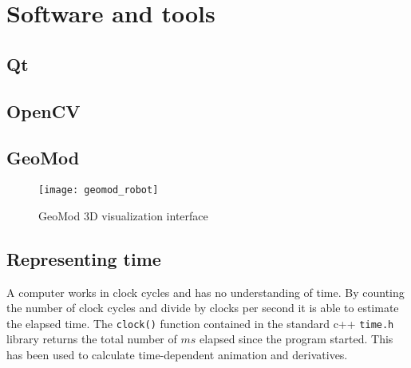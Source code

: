 \chapter{Software and tools}

\section{Qt}

\section{OpenCV}


\section{GeoMod}


\begin{figure}
 \centering 
 \texttt{[image: geomod\_robot]}
 \caption{GeoMod 3D visualization interface}
 \label{geomod_interface}
\end{figure}

\section{Representing time}\label{reptime}

A computer works in clock cycles and has no understanding of time. By counting the number of clock cycles and divide by clocks per second it is able to estimate the elapsed time. The \texttt{clock()} function contained in the standard c++ \texttt{time.h} library returns the total number of $ms$ elapsed since the program started. This has been used to calculate time-dependent animation and derivatives.
